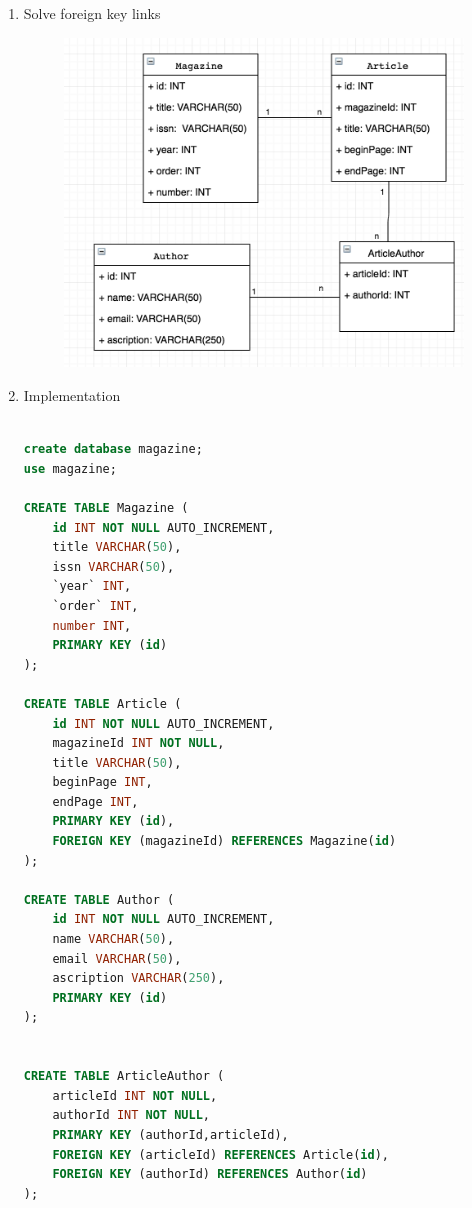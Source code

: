 \documentclass[12pt]{article}
\begin{document}
\begin{enumerate}
\item Solve foreign key links

\begin{figure}[H]
\includegraphics[width=\textwidth]{keys.png}
\end{figure}

\item Implementation

\begin{lstlisting}[language=SQL]

create database magazine;
use magazine;

CREATE TABLE Magazine (
	id INT NOT NULL AUTO_INCREMENT,
	title VARCHAR(50),
	issn VARCHAR(50),
	`year` INT,
	`order` INT,
	number INT,
	PRIMARY KEY (id)
);

CREATE TABLE Article (
	id INT NOT NULL AUTO_INCREMENT,
	magazineId INT NOT NULL,
	title VARCHAR(50),
	beginPage INT,
	endPage INT,
	PRIMARY KEY (id),
	FOREIGN KEY (magazineId) REFERENCES Magazine(id)
);

CREATE TABLE Author (
	id INT NOT NULL AUTO_INCREMENT,
	name VARCHAR(50),
	email VARCHAR(50),
	ascription VARCHAR(250),
	PRIMARY KEY (id)
);


CREATE TABLE ArticleAuthor (
	articleId INT NOT NULL,
	authorId INT NOT NULL,
	PRIMARY KEY (authorId,articleId),
	FOREIGN KEY (articleId) REFERENCES Article(id),
	FOREIGN KEY (authorId) REFERENCES Author(id)
);



\end{lstlisting}



\end{enumerate}




 
\end{document}
